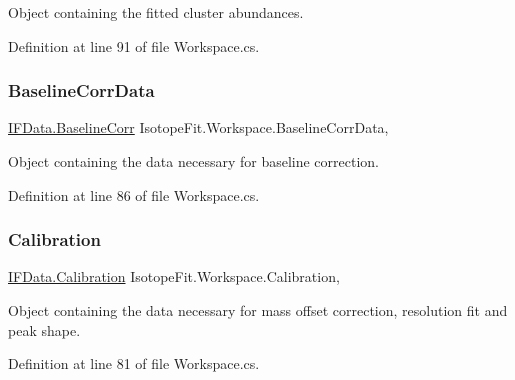 Object containing the fitted cluster abundances. 



Definition at line 91 of file Workspace.\+cs.

\mbox{\label{class_isotope_fit_1_1_workspace_a700395fbb329b1a0fcb5932095db066f}} 
\subsubsection{\texorpdfstring{Baseline\+Corr\+Data}{BaselineCorrData}}
{\footnotesize\ttfamily \hyperlink{class_isotope_fit_1_1_i_f_data_1_1_baseline_corr}{I\+F\+Data.\+Baseline\+Corr} Isotope\+Fit.\+Workspace.\+Baseline\+Corr\+Data\hspace{0.3cm}{\ttfamily [get]}, {\ttfamily [set]}}



Object containing the data necessary for baseline correction. 



Definition at line 86 of file Workspace.\+cs.

\mbox{\label{class_isotope_fit_1_1_workspace_a0ed1cfd6701db24de84f4ba67eed0442}} 
\subsubsection{\texorpdfstring{Calibration}{Calibration}}
{\footnotesize\ttfamily \hyperlink{class_isotope_fit_1_1_i_f_data_1_1_calibration}{I\+F\+Data.\+Calibration} Isotope\+Fit.\+Workspace.\+Calibration\hspace{0.3cm}{\ttfamily [get]}, {\ttfamily [set]}}



Object containing the data necessary for mass offset correction, resolution fit and peak shape. 



Definition at line 81 of file Workspace.\+cs.

\mbox{\label{class_isotope_fit_1_1_workspace_a13958fbe0adace21990cb1eabbd421e9}} 
